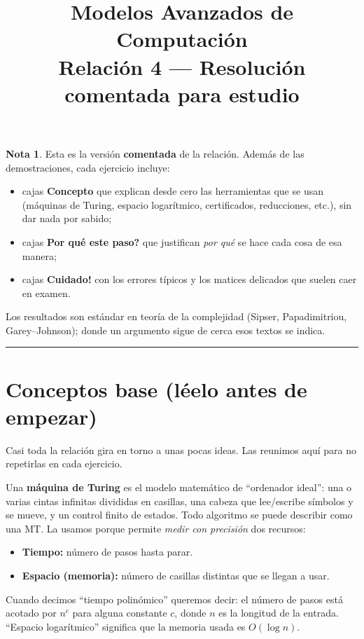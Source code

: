 \documentclass[11pt,a4paper]{article}
\title{\textbf{Modelos Avanzados de Computaci\'on}\\[2mm]
\large Relaci\'on 4 --- Resoluci\'on comentada para estudio}
\author{}
\date{}
\theoremstyle{plain}
\theoremstyle{definition}
\newtheorem*{nota}{Nota}
\begin{document}
\maketitle
\thispagestyle{fancy}

\begin{nota}
Esta es la versi\'on \textbf{comentada} de la relaci\'on. Adem\'as de las
demostraciones, cada ejercicio incluye:
\begin{itemize}[nosep]
  \item cajas \textcolor{blue!55!black}{\textbf{Concepto}} que explican desde cero
        las herramientas que se usan (m\'aquinas de Turing, espacio logar\'itmico,
        certificados, reducciones, etc.), sin dar nada por sabido;
  \item cajas \textcolor{green!45!black}{\textbf{\textquestiondown{}Por qu\'e este paso?}} que
        justifican \emph{por qu\'e} se hace cada cosa de esa manera;
  \item cajas \textcolor{red!55!black}{\textbf{\textexclamdown{}Cuidado!}} con los errores t\'ipicos
        y los matices delicados que suelen caer en examen.
\end{itemize}
Los resultados son est\'andar en teor\'ia de la complejidad (Sipser, Papadimitriou,
Garey--Johnson); donde un argumento sigue de cerca esos textos se indica.
\end{nota}

\tableofcontents
\vspace{4mm}\hrule\vspace{4mm}

\section*{Conceptos base (l\'eelo antes de empezar)}

Casi toda la relaci\'on gira en torno a unas pocas ideas. Las reunimos aqu\'i para no
repetirlas en cada ejercicio.

\begin{concepto}
Una \textbf{m\'aquina de Turing} es el modelo matem\'atico de ``ordenador ideal'':
una o varias cintas infinitas divididas en casillas, una cabeza que lee/escribe
s\'imbolos y se mueve, y un control finito de estados. Todo algoritmo se puede
describir como una MT. La usamos porque permite \emph{medir con precisi\'on} dos
recursos:
\begin{itemize}[nosep]
  \item \textbf{Tiempo:} n\'umero de pasos hasta parar.
  \item \textbf{Espacio (memoria):} n\'umero de casillas distintas que se llegan a
        usar.
\end{itemize}
Cuando decimos ``tiempo polin\'omico'' queremos decir: el n\'umero de pasos est\'a
acotado por $n^{c}$ para alguna constante $c$, donde $n$ es la longitud de la
entrada. ``Espacio logar\'itmico'' significa que la memoria usada es $O(\log n)$.
\end{concepto}
\end{document}
